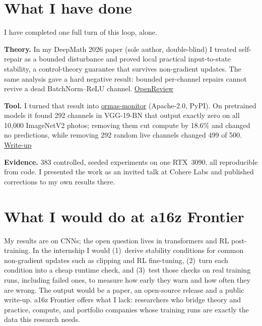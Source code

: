 \documentclass[10pt,a4paper]{article}
\begin{document}
\section*{What I have done}
I have completed one full turn of this loop, alone.
\begin{bullets}
  \item \textbf{Theory.} In my DeepMath 2026 paper (sole author, double-blind) I treated self-repair as a bounded disturbance and proved local practical input-to-state stability, a control-theory guarantee that survives non-gradient updates. The same analysis gave a hard negative result: bounded per-channel repairs cannot revive a dead BatchNorm--ReLU channel. \href{https://openreview.net/forum?id=kowltBZEIv}{OpenReview}
  \item \textbf{Tool.} I turned that result into \href{https://github.com/Oxiedo/ormas-monitor}{ormas-monitor} (Apache-2.0, PyPI). On pretrained models it found 292 channels in VGG-19-BN that output exactly zero on all 10,000 ImageNetV2 photos; removing them cut compute by 18.6\% and changed no predictions, while removing 292 random live channels changed 499 of 500. \href{https://www.raadh.me/dead-channels}{Write-up}
  \item \textbf{Evidence.} 383 controlled, seeded experiments on one RTX~3090, all reproducible from code. I presented the work as an invited talk at Cohere Labs and published corrections to my own results there.
\end{bullets}

\section*{What I would do at a16z Frontier}
My results are on CNNs; the open question lives in transformers and RL post-training. In the internship I would (1)~derive stability conditions for common non-gradient updates such as clipping and RL fine-tuning, (2)~turn each condition into a cheap runtime check, and (3)~test those checks on real training runs, including failed ones, to measure how early they warn and how often they are wrong. The output would be a paper, an open-source release and a public write-up. a16z Frontier offers what I lack: researchers who bridge theory and practice, compute, and portfolio companies whose training runs are exactly the data this research needs.
\end{document}
